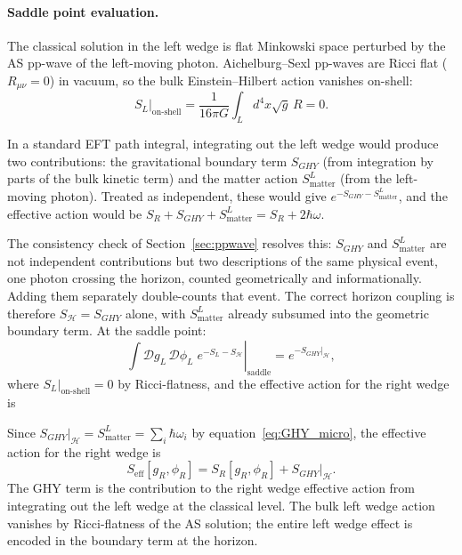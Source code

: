 \paragraph{Saddle point evaluation.}
The classical solution in the left wedge is flat 
Minkowski space perturbed by the AS pp-wave of the 
left-moving photon. Aichelburg--Sexl pp-waves are 
Ricci flat ($R_{\mu\nu} = 0$) in vacuum, so the 
bulk Einstein--Hilbert action vanishes on-shell:
%
\begin{equation}
S_L\big|_{\text{on-shell}} 
= \frac{1}{16\pi G}\int_L d^4x\sqrt{g}\,R = 0.
\end{equation}

In a standard EFT path integral, integrating out 
the left wedge would produce two contributions: 
the gravitational boundary term $S_{GHY}$ (from 
integration by parts of the bulk kinetic term) 
and the matter action $S_{\text{matter}}^L$ 
(from the left-moving photon). Treated as 
independent, these would give 
$e^{-S_{GHY} - S_{\text{matter}}^L}$, 
and the effective action would be 
$S_R + S_{GHY} + S_{\text{matter}}^L = 
S_R + 2\hbar\omega$.

The consistency check of 
Section~\ref{sec:ppwave} resolves this: 
$S_{GHY}$ and $S_{\text{matter}}^L$ are not 
independent contributions but two descriptions 
of the same physical event, one photon 
crossing the horizon, counted geometrically 
and informationally. Adding them separately 
double-counts that event. The correct horizon 
coupling is therefore $S_{\mathcal{H}} = 
S_{GHY}$ alone, with $S_{\text{matter}}^L$ 
already subsumed into the geometric boundary 
term. At the saddle point:
%
\begin{equation}
\left.
\int \mathcal{D}g_L\,\mathcal{D}\phi_L\;
e^{-S_L - S_{\mathcal{H}}}
\right|_{\text{saddle}}
= e^{-S_{GHY}|_{\mathcal{H}}},
\end{equation}
%
where $S_L|_{\text{on-shell}} = 0$ by 
Ricci-flatness, and the effective action for 
the right wedge is

Since $S_{GHY}|_{\mathcal{H}} = 
S_{\text{matter}}^L = \sum_i\hbar\omega_i$ 
by equation~\eqref{eq:GHY_micro}, the effective 
action for the right wedge is
%
\begin{equation}
\boxed{
S_{\text{eff}}[g_R,\phi_R]
= S_R[g_R,\phi_R] + S_{GHY}\big|_{\mathcal{H}}.
}
\label{eq:Seff}
\end{equation}
%
The GHY term is the contribution to the right 
wedge effective action from integrating out the 
left wedge at the classical level. The bulk left 
wedge action vanishes by Ricci-flatness of the 
AS solution; the entire left wedge effect is 
encoded in the boundary term at the horizon.

